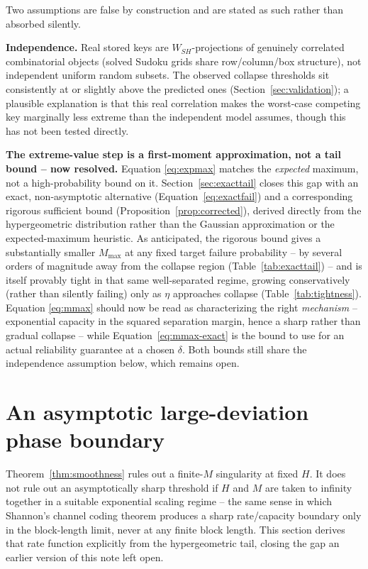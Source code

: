 \documentclass[11pt]{article}
\begin{document}
Two assumptions are false by construction and are stated as such rather than absorbed silently.

\textbf{Independence.} Real stored keys are $W_{SH}$-projections of genuinely correlated
combinatorial objects (solved Sudoku grids share row/column/box structure), not independent
uniform random subsets. The observed collapse thresholds sit consistently at or slightly above
the predicted ones (Section~\ref{sec:validation}); a plausible explanation is that this real
correlation makes the worst-case competing key marginally less extreme than the independent
model assumes, though this has not been tested directly.

\textbf{The extreme-value step is a first-moment approximation, not a tail bound -- now
resolved.} Equation \ref{eq:expmax} matches the \emph{expected} maximum, not a high-probability
bound on it. Section~\ref{sec:exacttail} closes this gap with an exact, non-asymptotic
alternative (Equation~\ref{eq:exactfail}) and a corresponding rigorous sufficient bound
(Proposition~\ref{prop:corrected}), derived directly from the hypergeometric distribution rather
than the Gaussian approximation or the expected-maximum heuristic. As anticipated, the rigorous
bound gives a substantially smaller $M_{\max}$ at any fixed target failure probability --
by several orders of magnitude away from the collapse region (Table~\ref{tab:exacttail}) -- and
is itself provably tight in that same well-separated regime, growing conservatively (rather than
silently failing) only as $\eta$ approaches collapse (Table~\ref{tab:tightness}). Equation
\ref{eq:mmax} should now be read as characterizing the right \emph{mechanism} -- exponential
capacity in the squared separation margin, hence a sharp rather than gradual collapse -- while
Equation~\ref{eq:mmax-exact} is the bound to use for an actual reliability guarantee at a chosen
$\delta$. Both bounds still share the independence assumption below, which remains open.

\section{An asymptotic large-deviation phase boundary}
\label{sec:outlook}

Theorem~\ref{thm:smoothness} rules out a finite-$M$ singularity at fixed $H$. It does not rule out
an asymptotically sharp threshold if $H$ and $M$ are taken to infinity together in a suitable
exponential scaling regime -- the same sense in which Shannon's channel coding theorem
\cite{coverthomas} produces a sharp rate/capacity boundary only in the block-length limit, never at
any finite block length. This section derives that rate function explicitly from the hypergeometric
tail, closing the gap an earlier version of this note left open.
\end{document}
